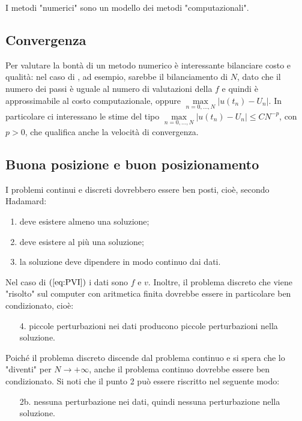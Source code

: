 \documentclass[hidelinks, 10pt]{report}
\begin{document}
I metodi "numerici" sono un modello dei metodi "computazionali".

\subsection{Convergenza}
Per valutare la bont\`a  di un metodo numerico \`e interessante bilanciare costo e qualit\`a: nel caso di , ad esempio, sarebbe il bilanciamento di $ N $, dato che il numero dei passi \`e uguale al numero di valutazioni della $ f $ e quindi \`e approssimabile al costo computazionale, oppure  $ \max\limits_{n = 0, \dotsc, N} \vert u(t_{n})  - U_{n} \vert $. In particolare ci interessano le stime del tipo $ \max\limits_{n = 0, \dotsc, N} \vert u(t_{n})  - U_{n} \vert \le C N^{-p} $, con $ p > 0 $, che qualifica anche la velocit\`a di convergenza.

\subsection{Buona posizione e buon posizionamento}
I problemi continui e discreti dovrebbero essere ben posti, cio\`e, secondo Hadamard:
\begin{enumerate}
\item deve esistere almeno una soluzione;
\item deve esistere al pi\`u una soluzione;
\item la soluzione deve dipendere in modo continuo dai dati.
\end{enumerate}

Nel caso di $ (\ref{eq:PVI}) $ i dati sono $ f $ e $ v $. Inoltre, il problema discreto che viene "risolto" sul computer con aritmetica finita dovrebbe essere in particolare ben condizionato, cio\`e:
\begin{enumerate}
\item[4.] piccole perturbazioni nei dati producono piccole perturbazioni nella soluzione.
\end{enumerate}

Poich\'e il problema discreto discende dal problema continuo e si spera che lo "diventi" per $ N \to +\infty $, anche il problema continuo dovrebbe essere ben condizionato. Si noti che il punto 2 pu\`o essere riscritto nel seguente modo:
\begin{enumerate}
\item[2b.] nessuna perturbazione nei dati, quindi nessuna perturbazione nella soluzione.  
\end{enumerate}
\end{document}
